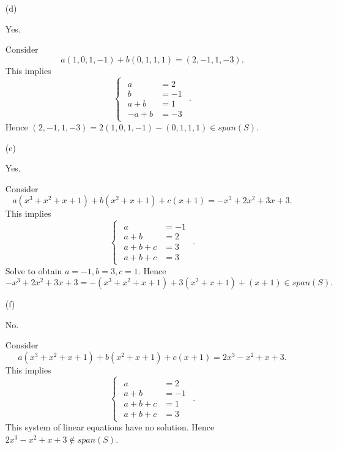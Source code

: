\begin{Exercise}
\begin{enumerate}[(a)]
\item[(d)]
\begin{answer}
Yes.
\end{answer}
\begin{solution}
Consider
$$
a(1,0,1,-1)+b(0,1,1,1) = (2,-1,1,-3).
$$
This implies
$$
\begin{cases}
\begin{aligned}
a &= 2 \\
b &= -1 \\
a+b &= 1 \\
-a+b &= -3
\end{aligned}
\end{cases}.
$$
Hence $(2,-1,1,-3) = 2(1,0,1,-1)-(0,1,1,1) \in span(S)$.
\end{solution}

\item[(e)]
\begin{answer}
Yes.
\end{answer}
\begin{solution}
Consider
$$
a(x^3+x^2+x+1)+b(x^2+x+1)+c(x+1) = -x^3+2x^2+3x+3.
$$
This implies
$$
\begin{cases}
\begin{aligned}
a &= -1 \\
a+b &= 2 \\
a+b+c &= 3 \\
a+b+c &= 3
\end{aligned}
\end{cases}.
$$
Solve to obtain $a=-1,b=3,c=1$. Hence 
$$
-x^3+2x^2+3x+3=-(x^3+x^2+x+1)+3(x^2+x+1)+(x+1)\in span(S).
$$
\end{solution}

\item[(f)]
\begin{answer}
No.
\end{answer}
\begin{solution}
Consider
$$
a(x^3+x^2+x+1)+b(x^2+x+1)+c(x+1) = 2x^3-x^2+x+3.
$$
This implies
$$
\begin{cases}
\begin{aligned}
a &= 2 \\
a+b &= -1 \\
a+b+c &= 1 \\
a+b+c &= 3
\end{aligned}
\end{cases}.
$$
This system of linear equations have no solution. Hence $2x^3-x^2+x+3\notin span(S)$.
\end{solution}


\end{enumerate}
\end{Exercise}

